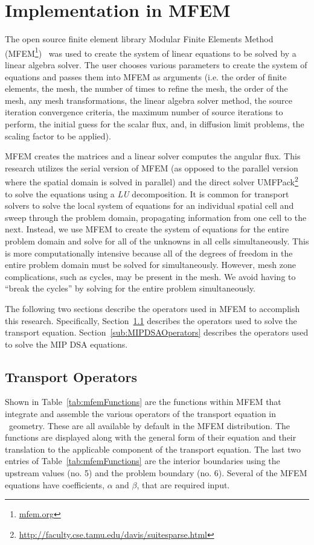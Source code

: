 \documentclass{article}
\begin{document}
\section{Implementation in MFEM}
The open source finite element library Modular Finite Elements Method (MFEM\footnote{\url{mfem.org}})~\cite{MFEM_Web} was used to create the system of linear equations to be solved by a linear algebra solver. The user chooses various parameters to create the system of equations and passes them into MFEM as arguments (i.e. the order of finite elements, the mesh, the number of times to refine the mesh, the order of the mesh, any mesh transformations, the linear algebra solver method, the source iteration convergence criteria, the maximum number of source iterations to perform, the initial guess for the scalar flux, and, in diffusion limit problems, the scaling factor to be applied).

MFEM creates the matrices and a linear solver computes the angular flux. This research utilizes the serial version of MFEM (as opposed to the parallel version where the spatial domain is solved in parallel) and the direct solver UMFPack\footnote{\url{http://faculty.cse.tamu.edu/davis/suitesparse.html}}~\cite{SuiteSparse,DavisUMFPack} to solve the equations using a \emph{LU} decomposition. It is common for transport solvers to solve the local system of equations for an individual spatial cell and sweep through the problem domain, propagating information from one cell to the next. Instead, we use MFEM to create the system of equations for the entire problem domain and solve for all of the unknowns in all cells simultaneously. This is more computationally intensive because all of the degrees of freedom in the entire problem domain must be solved for simultaneously. However, mesh zone complications, such as cycles, may be present in the mesh. We avoid having to ``break the cycles'' by solving for the entire problem simultaneously.

The following two sections describe the operators used in MFEM to accomplish this research. Specifically, Section~\ref{sub:TransportOperators} describes the operators used to solve the transport equation. Section~\ref{sub:MIPDSAOperators} describes the operators used to solve the MIP DSA equations.

\subsection{Transport Operators}
\label{sub:TransportOperators}
Shown in Table~\ref{tab:mfemFunctions} are the functions within MFEM that integrate and assemble the various operators of the transport equation in \XY\ geometry. These are all available by default in the MFEM distribution. The functions are displayed along with the general form of their equation and their translation to the applicable component of the transport equation. The last two entries of Table~\ref{tab:mfemFunctions} are the interior boundaries using the upstream values (no. 5) and the problem boundary (no. 6). Several of the MFEM equations have coefficients, $\alpha$ and $\beta$, that are required input. 
\end{document}
